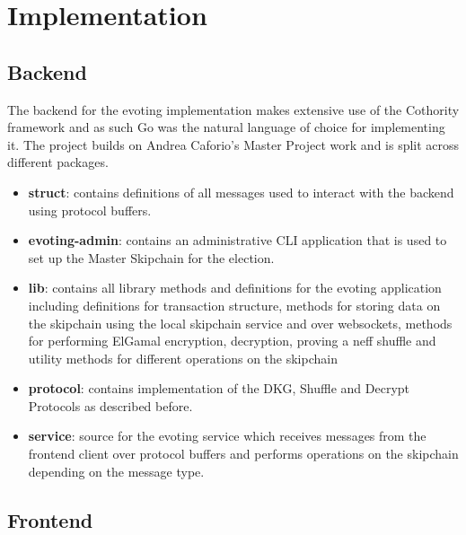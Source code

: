 
\chapter{Implementation} %

\label{Chapter3} %


\section{Backend}

The backend for the evoting implementation makes extensive use of the Cothority framework and as such Go was the natural language of choice for implementing it. The project builds on Andrea Caforio's Master Project work and is split across different packages.

\begin{itemize}
  \item \textbf{struct}: contains definitions of all messages used to interact with the backend using protocol buffers.
  \item \textbf{evoting-admin}: contains an administrative CLI application that is used to set up the Master Skipchain for the election.
  \item \textbf{lib}: contains all library methods and definitions for the evoting application including definitions for transaction structure, methods for storing data on the skipchain using the local skipchain service and over websockets, methods for performing ElGamal encryption, decryption, proving a neff shuffle and utility methods for different operations on the skipchain
  \item \textbf{protocol}: contains implementation of the DKG, Shuffle and Decrypt Protocols as described before.
  \item \textbf{service}: source for the evoting service which receives messages from the frontend client over protocol buffers and performs operations on the skipchain depending on the message type.
\end{itemize}

\section{Frontend}

